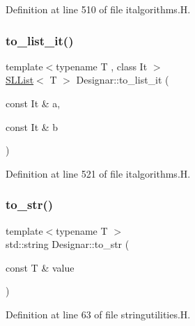Definition at line 510 of file italgorithms.\+H.

\mbox{\label{namespace_designar_a500a98cf132b734b9058abdae7cd2e5d}} 
\subsubsection{\texorpdfstring{to\+\_\+list\+\_\+it()}{to\_list\_it()}}
{\footnotesize\ttfamily template$<$typename T , class It $>$ \\
\hyperlink{class_designar_1_1_s_l_list}{S\+L\+List}$<$ T $>$ Designar\+::to\+\_\+list\+\_\+it (\begin{DoxyParamCaption}\item[{const It \&}]{a,  }\item[{const It \&}]{b }\end{DoxyParamCaption})}



Definition at line 521 of file italgorithms.\+H.

\mbox{\label{namespace_designar_a3a65054e43d88058112c15679b43c4e4}} 
\subsubsection{\texorpdfstring{to\+\_\+str()}{to\_str()}}
{\footnotesize\ttfamily template$<$typename T $>$ \\
std\+::string Designar\+::to\+\_\+str (\begin{DoxyParamCaption}\item[{const T \&}]{value }\end{DoxyParamCaption})}



Definition at line 63 of file stringutilities.\+H.

\mbox{\label{namespace_designar_a98d4bef12f5a30df5bf8a1fe56314330}} 
